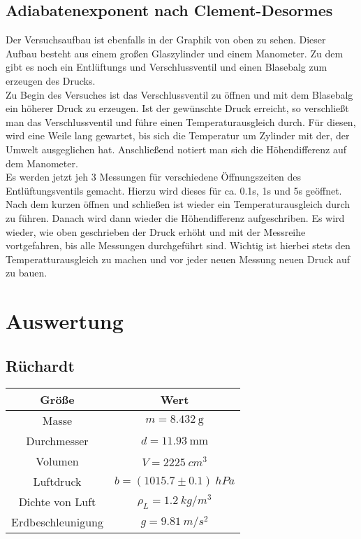 \documentclass[12pt,a4paper,titlepage,headinclude,bibtotoc]{scrartcl}
\begin{document}
\subsection{Adiabatenexponent nach Clement-Desormes}
Der Versuchsaufbau ist ebenfalls in der Graphik %
von oben zu sehen.
Dieser Aufbau besteht aus einem großen Glaszylinder und einem Manometer.
Zu dem gibt es noch ein Entlüftungs und Verschlussventil und einen Blasebalg zum erzeugen des Drucks.\\
Zu Begin des Versuches ist das Verschlussventil zu öffnen und mit dem Blasebalg ein höherer Druck zu erzeugen.
Ist der gewünschte Druck erreicht, so verschließt man das Verschlussventil und führe einen Temperaturausgleich durch.
Für diesen, wird eine Weile lang gewartet, bis sich die Temperatur um Zylinder mit der, der Umwelt ausgeglichen hat.
Anschließend notiert man sich die Höhendifferenz auf dem Manometer.\\
Es werden jetzt jeh 3 Messungen für verschiedene Öffnungszeiten des Entlüftungsventils gemacht.
Hierzu wird dieses für ca. 0.1s, 1s und 5s geöffnet.
Nach dem kurzen öffnen und schließen ist wieder ein Temperaturausgleich durch zu führen.
Danach wird dann wieder die Höhendifferenz aufgeschriben.
Es wird wieder, wie oben geschrieben der Druck erhöht und mit der Messreihe vortgefahren, bis alle Messungen durchgeführt sind.
Wichtig ist hierbei stets den Temperatturausgleich zu machen und vor jeder neuen Messung neuen Druck auf zu bauen.

\section{Auswertung}
\label{sec:auswertung}
\subsection{Rüchardt}

\begin{table}[!hbt]
	\centering
	\begin{tabular}{|c|c|}
		\hline
		Größe & Wert\\
		\hline
		\hline
		Masse & $m = 8.432~\si{\gram}$\\
		Durchmesser & $d = 11.93~\si{\milli\meter}$\\
		Volumen & $V = 2225~\si{cm^3}$\\
		\hline
		Luftdruck & $b = (1015.7 \pm 0.1)~\si{hPa}$\\ 		
		\hline
		Dichte von Luft & $\rho_L = 1.2~\si{kg/m^3}$\\
		Erdbeschleunigung & $g = 9.81~\si{m/s^2}$\\		
		\hline
	\end{tabular}
\end{table}
\end{document}
